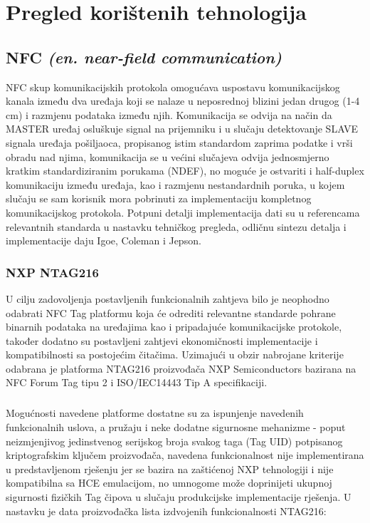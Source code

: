\chapter{Pregled korištenih tehnologija}

\section{NFC \textit{(en. near-field communication)}}
NFC skup komunikacijskih protokola omogućava uspostavu komunikacijskog kanala između dva uređaja koji se nalaze u neposrednoj blizini jedan drugog (1-4 cm) i razmjenu podataka između njih\cite{NFCProtocol}. Komunikacija se odvija na način da MASTER uređaj osluškuje signal na prijemniku i u slučaju detektovanje SLAVE signala uređaja pošiljaoca, propisanog istim standardom zaprima podatke i vrši obradu nad njima, komunikacija se u većini slučajeva odvija jednosmjerno kratkim standardiziranim porukama (NDEF), no moguće je ostvariti i half-duplex komunikaciju između uređaja, kao i razmjenu nestandardnih poruka, u kojem slučaju se sam korisnik mora pobrinuti za implementaciju kompletnog komunikacijskog protokola. Potpuni detalji implementacija dati su u referencama relevantnih standarda u nastavku tehničkog pregleda, odličnu sintezu detalja i implementacije daju Igoe, Coleman i Jepson\cite{Igoe2014}.
\subsection{NXP NTAG216}
U cilju zadovoljenja postavljenih funkcionalnih zahtjeva bilo je neophodno odabrati NFC Tag platformu koja će odrediti relevantne standarde pohrane binarnih podataka na uređajima kao i pripadajuće komunikacijske protokole, također dodatno su postavljeni zahtjevi ekonomičnosti implementacije i kompatibilnosti sa postojećim čitačima. Uzimajući u obzir nabrojane kriterije odabrana je platforma NTAG216 proizvođača NXP Semiconductors\cite{NTAG216} bazirana na NFC Forum Tag tipu 2 i ISO/IEC14443 Tip A specifikaciji\cite{NFCTag2}\cite{ISO14443}. 

\paragraph*{}
Mogućnosti navedene platforme dostatne su za ispunjenje navedenih funkcionalnih uslova, a pružaju i neke dodatne sigurnosne mehanizme - poput neizmjenjivog jedinstvenog serijskog broja svakog taga (Tag UID) potpisanog kriptografskim ključem proizvođača, navedena funkcionalnost nije implementirana u predstavljenom rješenju jer se bazira na zaštićenoj NXP tehnologiji i nije kompatibilna sa HCE emulacijom, no umnogome može doprinijeti ukupnoj sigurnosti fizičkih Tag čipova u slučaju produkcijske implementacije rješenja. U nastavku je data proizvođačka lista izdvojenih funkcionalnosti NTAG216:

